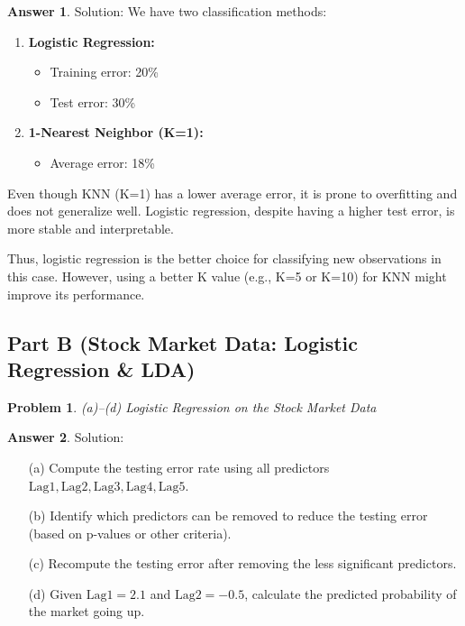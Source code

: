 \documentclass[12pt]{article}
\newtheorem{problem}{Problem} %
\theoremstyle{definition}
\newtheorem*{answer}{Answer}
\newcommand{\solution}{\textcolor{PineGreen}{Solution:\newline}}
\begin{document}
\begin{answer}
\solution
We have two classification methods:

\begin{enumerate}
    \item \textbf{Logistic Regression:}
    \begin{itemize}
        \item Training error: 20\%
        \item Test error: 30\%
    \end{itemize}
    
    \item \textbf{1-Nearest Neighbor (K=1):}
    \begin{itemize}
        \item Average error: 18\%
    \end{itemize}
\end{enumerate}

Even though KNN (K=1) has a lower average error, it is prone to overfitting and does not generalize well. Logistic regression, despite having a higher test error, is more stable and interpretable.

Thus, logistic regression is the better choice for classifying new observations in this case. However, using a better K value (e.g., K=5 or K=10) for KNN might improve its performance.
\end{answer}

\subsection*{Part B (Stock Market Data: Logistic Regression \& LDA)}

\setcounter{problem}{0}
\begin{problem}
\textbf{} (a)--(d) Logistic Regression on the Stock Market Data
\end{problem}

\begin{answer}
\solution
\begin{itemize}
    \item[(a)] Compute the testing error rate using all predictors \(\text{Lag1}, \text{Lag2}, \text{Lag3}, \text{Lag4}, \text{Lag5}\).
    \item[(b)] Identify which predictors can be removed to reduce the testing error (based on p-values or other criteria).
    \item[(c)] Recompute the testing error after removing the less significant predictors.
    \item[(d)] Given \(\text{Lag1} = 2.1\) and \(\text{Lag2} = -0.5\), calculate the predicted probability of the market going up.
\end{itemize}
\end{answer}
\end{document}
